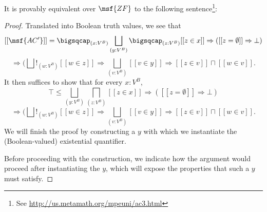 \documentclass[11pt]{article}
\begin{document}
It is provably equivalent over $\msf{ZF}$ to the following sentence\footnote{See \url{http://us.metamath.org/mpeuni/ac3.html}}:


\begin{proof}
  Translated into Boolean truth values, we see that
  $$
[[\msf{AC'}]] = \bigsqcap_{(x : V^B)} \bigsqcup_{(y : V^B)} \bigsqcap_{(z : V^B)} [[z \in x]] \Rightarrow \left([[z = \emptyset]] \Rightarrow \bot \right) $$ $$ \Rightarrow (\bigsqcup!_{(w : V^B)} [[w \in z]] \Rightarrow \bigsqcup_{(v : V^B)} [[v \in y]] \Rightarrow [[z \in v]] \sqcap [[w \in v]].
$$
It then suffices to show that for every $x : V^B$,
$$
\top \leq \bigsqcup_{(y : V^B)} \bigsqcap_{(z : V^B)} [[z \in x]] \Rightarrow \left([[z = \emptyset]] \Rightarrow \bot \right) $$ $$ \Rightarrow (\bigsqcup!_{(w : V^B)} [[w \in z]] \Rightarrow \bigsqcup_{(v : V^B)} [[v \in y]] \Rightarrow [[z \in v]] \sqcap [[w \in v]].
$$
We will finish the proof by constructing a $y$ with which we instantiate the (Boolean-valued) existential quantifier.

Before proceeding with the construction, we indicate how the argument would proceed after instantiating the $y$, which will expose the properties that such a $y$ must satisfy.


\end{proof}
\end{document}
